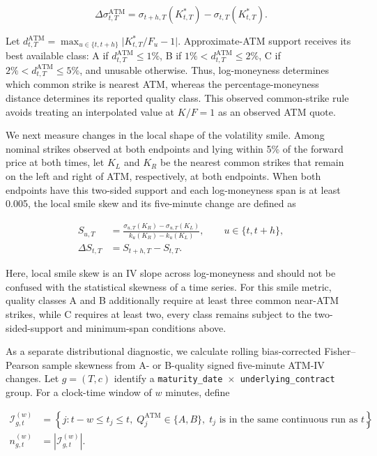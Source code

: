 \begin{equation}\label{eq:ch3:atm_iv_jump}
\Delta\sigma^{\mathrm{ATM}}_{t,T}
=
\sigma_{t+h,T}\!\left(K^{*}_{t,T}\right)
-
\sigma_{t,T}\!\left(K^{*}_{t,T}\right).
\end{equation}

Let
$d^{\mathrm{ATM}}_{t,T}=\max_{u\in\{t,t+h\}}
\lvert K^{*}_{t,T}/F_u-1\rvert$. Approximate-ATM support receives its best
available class: A if $d^{\mathrm{ATM}}_{t,T}\leq1\%$, B if
$1\%<d^{\mathrm{ATM}}_{t,T}\leq2\%$, C if
$2\%<d^{\mathrm{ATM}}_{t,T}\leq5\%$, and unusable otherwise. Thus,
log-moneyness determines which common strike is nearest ATM, whereas the
percentage-moneyness distance determines its reported quality class. This
observed common-strike rule avoids treating an interpolated value at $K/F=1$
as an observed ATM quote.

We next measure changes in the local shape of the volatility smile. Among
nominal strikes observed at both endpoints and lying within 5\% of the forward
price at both times, let $K_L$ and $K_R$ be the nearest common strikes that
remain on the left and right of ATM, respectively, at both endpoints. When
both endpoints have this two-sided support and each log-moneyness span is at
least 0.005, the local smile skew and its five-minute change are defined as

\begin{equation}\label{eq:ch3:local_smile_skew}
\begin{aligned}
S_{u,T}
&=
\frac{
\sigma_{u,T}(K_R)-\sigma_{u,T}(K_L)
}{
k_u(K_R)-k_u(K_L)
},
\qquad u\in\{t,t+h\},\\
\Delta S_{t,T}
&=
S_{t+h,T}-S_{t,T}.
\end{aligned}
\end{equation}

Here, local smile skew is an IV slope across log-moneyness and should not be
confused with the statistical skewness of a time series. For this smile metric,
quality classes A and B additionally require at least three common near-ATM
strikes, while C requires at least two, every class remains subject to the
two-sided-support and minimum-span conditions above.

As a separate distributional diagnostic, we calculate rolling
bias-corrected Fisher--Pearson sample skewness from A- or B-quality signed
five-minute ATM-IV changes. Let $g=(T,c)$ identify a
\texttt{maturity\_date $\times$ underlying\_contract}
group. For a clock-time window of $w$ minutes, define

\begin{equation}\label{eq:ch3:rolling_jump_skew_index}
\begin{aligned}
\mathcal I^{(w)}_{g,t}
&=
\left\{
j:
t-w\leq t_j\leq t,\;
Q^{\mathrm{ATM}}_j\in\{A,B\},\;
t_j\text{ is in the same continuous run as }t
\right\},\\
n^{(w)}_{g,t}
&=
\left\lvert\mathcal I^{(w)}_{g,t}\right\rvert .
\end{aligned}
\end{equation}

